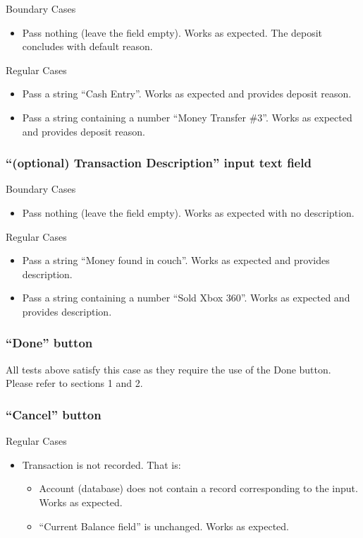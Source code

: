 \documentclass[12pt]{article}
\begin{document}
Boundary Cases
\begin{itemize}
  \item Pass nothing (leave the field empty). Works as expected. The deposit concludes with default reason.
\end{itemize}

Regular Cases
\begin{itemize}
  \item Pass a string  “Cash Entry”. Works as expected and provides deposit reason.
  \item Pass a string containing a number  “Money Transfer \#3”. Works as expected and provides deposit reason.
\end{itemize}

\subsubsection{“(optional) Transaction Description” input text field}

Boundary Cases
\begin{itemize}
  \item Pass nothing (leave the field empty). Works as expected with no description.
\end{itemize}

Regular Cases
\begin{itemize}
  \item Pass a string “Money found in couch”. Works as expected and provides description.
  \item Pass a string containing a number “Sold Xbox 360”. Works as expected and provides description.
\end{itemize}

\subsubsection{“Done” button}

All tests above satisfy this case as they require the use of the Done button. Please refer to sections 1 and 2.
	
\subsubsection{“Cancel” button}

Regular Cases
\begin{itemize}
  \item Transaction is not recorded. That is:
  \begin{itemize}
    \item Account (database) does not contain a record corresponding to the input. Works as expected.
    \item “Current Balance field” is unchanged. Works as expected.
  \end{itemize}
\end{itemize}
\end{document}
